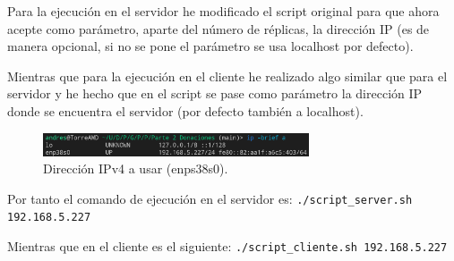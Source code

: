\documentclass{article}
\begin{document}
Para la ejecución en el servidor he modificado el script original para que ahora acepte como parámetro, aparte del número de réplicas, la dirección IP (es de manera opcional, si no se pone el parámetro se usa localhost por defecto).

Mientras que para la ejecución en el cliente he realizado algo similar que para el servidor y he hecho que en el script se pase como parámetro la dirección IP donde se encuentra el servidor (por defecto también a localhost).

\begin{figure}[H]
    \centering
    \includegraphics[width=0.7\textwidth]{imagenes/multiples ordenadores/IP.png}
    \caption{Dirección IPv4 a usar (enps38s0).}
\end{figure}

Por tanto el comando de ejecución en el servidor es: \verb|./script_server.sh 192.168.5.227|

Mientras que en el cliente es el siguiente: \verb|./script_cliente.sh 192.168.5.227|
\end{document}
